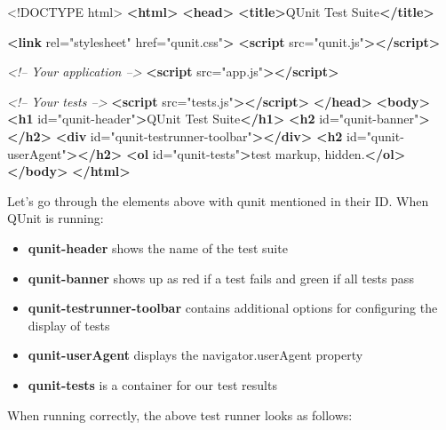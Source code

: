 \documentclass[9pt]{book}
\newenvironment{Shaded}{}{}
\newcommand{\KeywordTok}[1]{\textcolor[rgb]{0.00,0.44,0.13}{\textbf{{#1}}}}
\newcommand{\DataTypeTok}[1]{\textcolor[rgb]{0.56,0.13,0.00}{{#1}}}
\newcommand{\StringTok}[1]{\textcolor[rgb]{0.25,0.44,0.63}{{#1}}}
\newcommand{\CommentTok}[1]{\textcolor[rgb]{0.38,0.63,0.69}{\textit{{#1}}}}
\newcommand{\OtherTok}[1]{\textcolor[rgb]{0.00,0.44,0.13}{{#1}}}
\newcommand{\NormalTok}[1]{{#1}}
\begin{document}
\begin{Shaded}
\begin{Highlighting}[]
\DataTypeTok{<!DOCTYPE }\NormalTok{html}\DataTypeTok{>}
\KeywordTok{<html>}
\KeywordTok{<head>}
    \KeywordTok{<title>}\NormalTok{QUnit Test Suite}\KeywordTok{</title>}

     \KeywordTok{<link}\OtherTok{ rel=}\StringTok{"stylesheet"}\OtherTok{ href=}\StringTok{"qunit.css"}\KeywordTok{>}
     \KeywordTok{<script}\OtherTok{ src=}\StringTok{"qunit.js"}\KeywordTok{></script>}

     \CommentTok{<!-- Your application -->}
     \KeywordTok{<script}\OtherTok{ src=}\StringTok{"app.js"}\KeywordTok{></script>}

     \CommentTok{<!-- Your tests -->}
     \KeywordTok{<script}\OtherTok{ src=}\StringTok{"tests.js"}\KeywordTok{></script>}
\KeywordTok{</head>}
\KeywordTok{<body>}
    \KeywordTok{<h1}\OtherTok{ id=}\StringTok{"qunit-header"}\KeywordTok{>}\NormalTok{QUnit Test Suite}\KeywordTok{</h1>}
    \KeywordTok{<h2}\OtherTok{ id=}\StringTok{"qunit-banner"}\KeywordTok{></h2>}
    \KeywordTok{<div}\OtherTok{ id=}\StringTok{"qunit-testrunner-toolbar"}\KeywordTok{></div>}
    \KeywordTok{<h2}\OtherTok{ id=}\StringTok{"qunit-userAgent"}\KeywordTok{></h2>}
    \KeywordTok{<ol}\OtherTok{ id=}\StringTok{"qunit-tests"}\KeywordTok{>}\NormalTok{test markup, hidden.}\KeywordTok{</ol>}
\KeywordTok{</body>}
\KeywordTok{</html>}
\end{Highlighting}
\end{Shaded}

Let's go through the elements above with qunit mentioned in their ID.
When QUnit is running:

\begin{itemize}
\itemsep1pt\parskip0pt
\item
  \textbf{qunit-header} shows the name of the test suite
\item
  \textbf{qunit-banner} shows up as red if a test fails and green if all
  tests pass
\item
  \textbf{qunit-testrunner-toolbar} contains additional options for
  configuring the display of tests
\item
  \textbf{qunit-userAgent} displays the navigator.userAgent property
\item
  \textbf{qunit-tests} is a container for our test results
\end{itemize}

When running correctly, the above test runner looks as follows:
\end{document}
